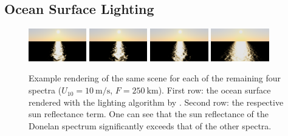 \subsection{Ocean Surface Lighting}
\label{sec:results:lighting}
%
\begin{figure}
\centering
{}
\hfill
{}
\hfill
{}
\hfill
{}
\subtop
{
	\includegraphics[width=0.225\textwidth]{figures/ross_pm.png}
}
\hfill
\subtop
{
	\includegraphics[width=0.225\textwidth]{figures/ross_jonswap.png}
}
\hfill
\subtop
{
	\includegraphics[width=0.225\textwidth]{figures/ross_unified.png}
}
\hfill
\subtop
{
	\includegraphics[width=0.225\textwidth]{figures/ross_donelan.png}
}
\caption[Example rendering of the sun reflectance for each spectrum.]{
Example rendering of the same scene for each of the remaining four spectra
($U_{10}=\SI{10}{\metre\per\second}$, $F=\SI{250}{\km}$).
First row: the ocean surface rendered with the lighting algorithm by
\cite{article:oceanlighting}.
Second row: the respective sun reflectance term.
One can see that the sun reflectance of the Donelan spectrum significantly
exceeds that of the other spectra.
}
\label{fig:sun_reflectance}
\end{figure}
